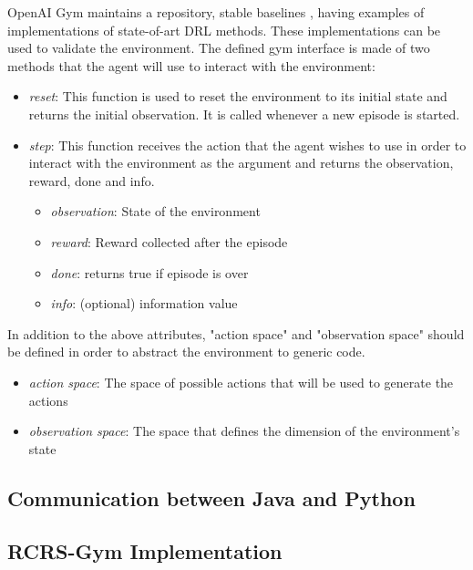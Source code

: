 \documentclass[12pt]{report}
\begin{document}
OpenAI Gym maintains a repository, stable baselines \cite{stable-baselines}, having examples of implementations of state-of-art DRL methods. These implementations can be used to validate the environment. The defined gym interface is made of two methods that the agent will use to interact with the environment:

\begin{itemize}
    \item \emph{reset}: This function is used to reset the environment to its initial state and returns the initial observation. It is called whenever a new episode is started. 
    \item \emph{step}: This function receives the action that the agent wishes to use in order to interact with the environment as the argument and returns the observation, reward, done and info. 
    \begin{itemize}
        \item \emph{observation}: State of the environment
        \item \emph{reward}: Reward collected after the episode
        \item \emph{done}: returns true if episode is over
        \item\emph{info}: (optional) information value
    \end{itemize}
\end{itemize}

In addition to the above attributes, "action space" and "observation space" should be defined in order to abstract the environment to generic code. 

\begin{itemize}
    \item \emph{action space}: The space of possible actions that will be used to generate the actions
    \item \emph{observation space}: The space that defines the dimension of the environment's state
\end{itemize}





\subsection{Communication between Java and Python} \label{CommunicationJavaPython}

\subsection{RCRS-Gym Implementation} \label{RCRSGymImplementation}
\end{document}
